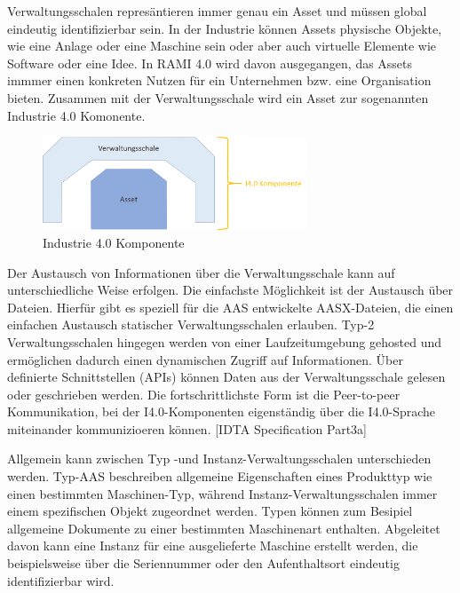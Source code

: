 Verwaltungsschalen represäntieren immer genau ein Asset und müssen global eindeutig identifizierbar sein.
In der Industrie können Assets physische Objekte, wie eine Anlage oder eine Maschine sein oder aber auch virtuelle Elemente wie Software oder eine Idee.
In RAMI 4.0 wird davon ausgegangen, das Assets immmer einen konkreten Nutzen für ein Unternehmen bzw. eine Organisation bieten.
Zusammen mit der Verwaltungsschale wird ein Asset zur sogenannten Industrie 4.0 Komonente. 

\begin{figure}[htbp]
    \centering
    \includegraphics[width=0.7\textwidth]{Bilder/aas.png}
    \caption{Industrie 4.0 Komponente}
    \label{fig:klassifizierungDT}
\end{figure}

Der Austausch von Informationen über die Verwaltungsschale kann auf unterschiedliche Weise erfolgen.
Die einfachste Möglichkeit ist der Austausch über Dateien. Hierfür gibt es speziell für die AAS entwickelte AASX-Dateien, die einen einfachen Austausch statischer Verwaltungsschalen erlauben.
Typ-2 Verwaltungsschalen hingegen werden von einer Laufzeitumgebung gehosted und ermöglichen dadurch einen dynamischen Zugriff auf Informationen.
Über definierte Schnittstellen (APIs) können Daten aus der Verwaltungsschale gelesen oder geschrieben werden.
Die fortschrittlichste Form ist die Peer-to-peer Kommunikation, bei der I4.0-Komponenten eigenständig über die I4.0-Sprache miteinander kommunizioeren können.
[IDTA Specification Part3a] 

Allgemein kann zwischen Typ -und Instanz-Verwaltungsschalen unterschieden werden.
Typ-AAS beschreiben allgemeine Eigenschaften eines Produkttyp wie einen bestimmten Maschinen-Typ, während Instanz-Verwaltungsschalen immer einem spezifischen Objekt zugeordnet werden.
Typen können zum Besipiel allgemeine Dokumente zu einer bestimmten Maschinenart enthalten.
Abgeleitet davon kann eine Instanz für eine ausgelieferte Maschine erstellt werden, die beispielsweise über die Seriennummer oder den Aufenthaltsort eindeutig identifizierbar wird.

